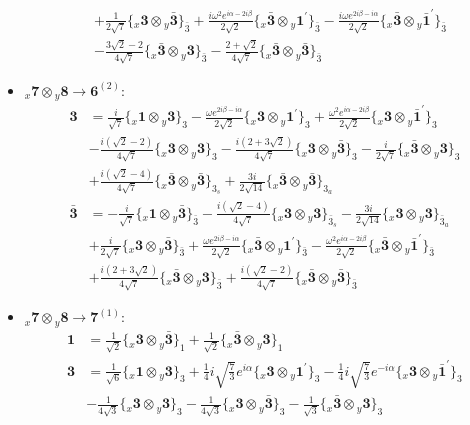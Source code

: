 \documentclass[english]{article}
\newcommand{\rep}[1]{\mathbf{#1}}
\newcommand{\repx}[2]{{}_{#2}\mathbf{#1}}
\newcommand{\subcg}[3]{\big\{ \repx{#1}{x}\otimes\repx{#2}{y}\big\}^{}_{#3}}
\begin{document}
\begin{itemize}
\begin{align*}
 & +\frac{1}{2 \sqrt{7}}\subcg{3}{\bar{3}}{\bar{3}}+\frac{i \omega ^2 e^{i \alpha -2 i \beta }}{2 \sqrt{2}}\subcg{\bar{3}}{1^{\prime}}{\bar{3}}-\frac{i \omega  e^{2 i \beta -i \alpha }}{2 \sqrt{2}}\subcg{\bar{3}}{\bar{1}^{\prime}}{\bar{3}} \\ 
 & -\frac{3 \sqrt{2}-2}{4 \sqrt{7}}\subcg{\bar{3}}{3}{\bar{3}}-\frac{2+\sqrt{2}}{4 \sqrt{7}}\subcg{\bar{3}}{\bar{3}}{\bar{3}}
\end{align*}
\item $\repx{7}{x}\otimes\repx{8}{y}\to\rep{6}^{(2)}$:
\begin{align*}
\rep{3} & = \frac{i}{\sqrt{7}}\subcg{1}{3}{3}-\frac{\omega  e^{2 i \beta -i \alpha }}{2 \sqrt{2}}\subcg{3}{1^{\prime}}{3}+\frac{\omega ^2 e^{i \alpha -2 i \beta }}{2 \sqrt{2}}\subcg{3}{\bar{1}^{\prime}}{3} \\ 
 & -\frac{i \left(\sqrt{2}-2\right)}{4 \sqrt{7}}\subcg{3}{3}{3}-\frac{i \left(2+3 \sqrt{2}\right)}{4 \sqrt{7}}\subcg{3}{\bar{3}}{3}-\frac{i}{2 \sqrt{7}}\subcg{\bar{3}}{3}{3} \\ 
 & +\frac{i \left(\sqrt{2}-4\right)}{4 \sqrt{7}}\subcg{\bar{3}}{\bar{3}}{3_{s}}+\frac{3 i}{2 \sqrt{14}}\subcg{\bar{3}}{\bar{3}}{3_{a}}
\\
\rep{\bar{3}} & = -\frac{i}{\sqrt{7}}\subcg{1}{\bar{3}}{\bar{3}}-\frac{i \left(\sqrt{2}-4\right)}{4 \sqrt{7}}\subcg{3}{3}{\bar{3}_{s}}-\frac{3 i}{2 \sqrt{14}}\subcg{3}{3}{\bar{3}_{a}} \\ 
 & +\frac{i}{2 \sqrt{7}}\subcg{3}{\bar{3}}{\bar{3}}+\frac{\omega  e^{2 i \beta -i \alpha }}{2 \sqrt{2}}\subcg{\bar{3}}{1^{\prime}}{\bar{3}}-\frac{\omega ^2 e^{i \alpha -2 i \beta }}{2 \sqrt{2}}\subcg{\bar{3}}{\bar{1}^{\prime}}{\bar{3}} \\ 
 & +\frac{i \left(2+3 \sqrt{2}\right)}{4 \sqrt{7}}\subcg{\bar{3}}{3}{\bar{3}}+\frac{i \left(\sqrt{2}-2\right)}{4 \sqrt{7}}\subcg{\bar{3}}{\bar{3}}{\bar{3}}
\end{align*}
\item $\repx{7}{x}\otimes\repx{8}{y}\to\rep{7}^{(1)}$:
\begin{align*}
\rep{1} & = \frac{1}{\sqrt{2}}\subcg{3}{\bar{3}}{1}+\frac{1}{\sqrt{2}}\subcg{\bar{3}}{3}{1}
\\
\rep{3} & = \frac{1}{\sqrt{6}}\subcg{1}{3}{3}+\frac{1}{4} i \sqrt{\frac{7}{3}} e^{i \alpha }\subcg{3}{1^{\prime}}{3}-\frac{1}{4} i \sqrt{\frac{7}{3}} e^{-i \alpha }\subcg{3}{\bar{1}^{\prime}}{3} \\ 
 & -\frac{1}{4 \sqrt{3}}\subcg{3}{3}{3}-\frac{1}{4 \sqrt{3}}\subcg{3}{\bar{3}}{3}-\frac{1}{\sqrt{3}}\subcg{\bar{3}}{3}{3} \\ 

\end{align*}
\end{itemize}
\end{document}
